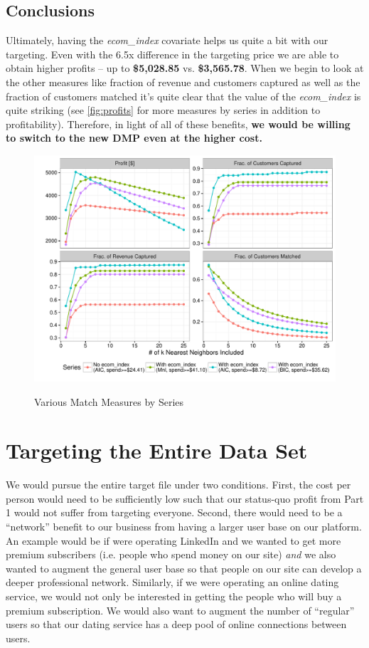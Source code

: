 


\subsection{Conclusions}
Ultimately, having the \textit{ecom\_index} covariate helps us quite a bit with our targeting.  Even with the 6.5x difference in the targeting price we are able to obtain higher profits -- up to \textbf{\$5,028.85} vs. \textbf{\$3,565.78}.  When we begin to look at the other measures like fraction of revenue and customers captured as well as the fraction of customers matched it's quite clear that the value of the \textit{ecom\_index} is quite striking (see \vref{fig:profits} for more measures by series in addition to profitability).  Therefore, in light of all of these benefits, \textbf{we would be willing to switch to the new DMP even at the higher cost.}

\begin{figure}[!htb]
  \centering
  \caption{Various Match Measures by Series}
  \includegraphics[scale=.75]{profits2.pdf}
  \label{fig:profits}
\end{figure}

\section{Targeting the Entire Data Set} %
We would pursue the entire target file under two conditions. First, the cost per person would need to be sufficiently low such that our status-quo profit from Part 1 would not suffer from targeting everyone. Second, there would need to be a “network” benefit to our business from having a larger user base on our platform. An example would be if were operating LinkedIn and we wanted to get more premium subscribers (i.e. people who spend money on our site) \textit{and} we also wanted to augment the general user base so that people on our site can develop a deeper professional network. Similarly, if we were operating an online dating service, we would not only be interested in getting the people who will buy a premium subscription. We would also want to augment the number of “regular” users so that our dating service has a deep pool of online connections between users.

